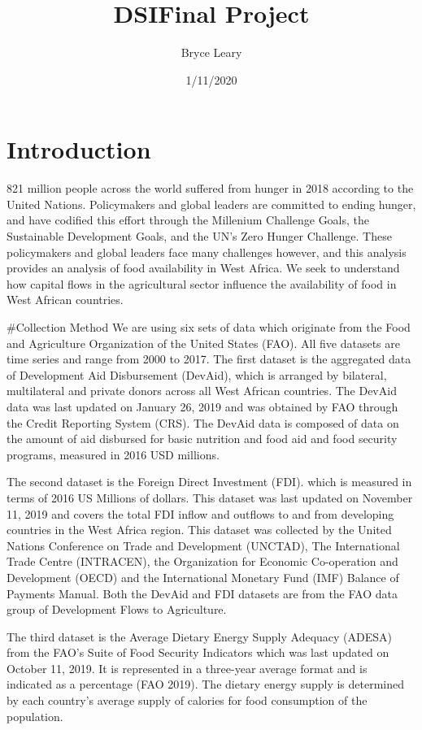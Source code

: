 \documentclass[
]{article}
\title{DSIFinal Project}
\author{Bryce Leary}
\date{1/11/2020}
\begin{document}
\maketitle

\hypertarget{introduction}{%
\section{Introduction}\label{introduction}}

821 million people across the world suffered from hunger in 2018
according to the United Nations. Policymakers and global leaders are
committed to ending hunger, and have codified this effort through the
Millenium Challenge Goals, the Sustainable Development Goals, and the
UN's Zero Hunger Challenge. These policymakers and global leaders face
many challenges however, and this analysis provides an analysis of food
availability in West Africa. We seek to understand how capital flows in
the agricultural sector influence the availability of food in West
African countries.

\#Collection Method We are using six sets of data which originate from
the Food and Agriculture Organization of the United States (FAO). All
five datasets are time series and range from 2000 to 2017. The first
dataset is the aggregated data of Development Aid Disbursement (DevAid),
which is arranged by bilateral, multilateral and private donors across
all West African countries. The DevAid data was last updated on January
26, 2019 and was obtained by FAO through the Credit Reporting System
(CRS). The DevAid data is composed of data on the amount of aid
disbursed for basic nutrition and food aid and food security programs,
measured in 2016 USD millions.

The second dataset is the Foreign Direct Investment (FDI). which is
measured in terms of 2016 US Millions of dollars. This dataset was last
updated on November 11, 2019 and covers the total FDI inflow and
outflows to and from developing countries in the West Africa region.
This dataset was collected by the United Nations Conference on Trade and
Development (UNCTAD), The International Trade Centre (INTRACEN), the
Organization for Economic Co-operation and Development (OECD) and the
International Monetary Fund (IMF) Balance of Payments Manual. Both the
DevAid and FDI datasets are from the FAO data group of Development Flows
to Agriculture.

The third dataset is the Average Dietary Energy Supply Adequacy (ADESA)
from the FAO's Suite of Food Security Indicators which was last updated
on October 11, 2019. It is represented in a three-year average format
and is indicated as a percentage (FAO 2019). The dietary energy supply
is determined by each country's average supply of calories for food
consumption of the population.
\end{document}
